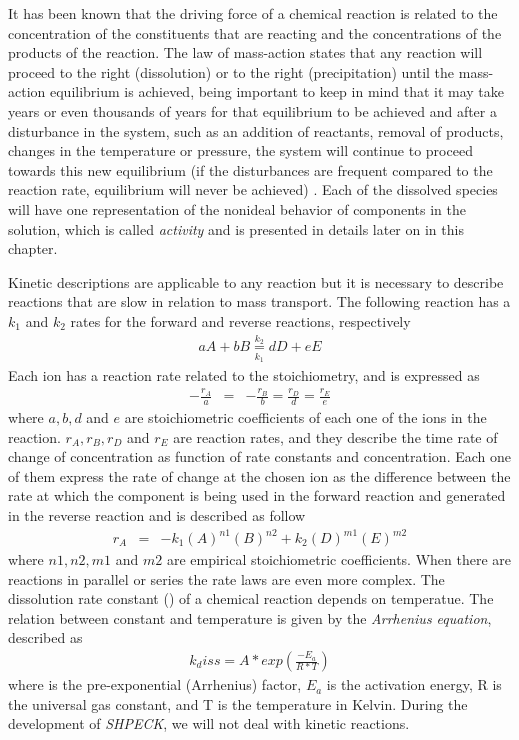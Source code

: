 It has been known that the driving force of a chemical reaction is related to the concentration of the constituents that are reacting and the concentrations of the products of the reaction. The law of mass-action states that any reaction will proceed to the right (dissolution) or to the right (precipitation) until the mass-action equilibrium is achieved, being important to keep in mind that it may take years or even thousands of years for that equilibrium to be achieved and after a disturbance in the system, such as an addition of reactants, removal of products, changes in the temperature or pressure, the system will continue to proceed towards this new equilibrium (if the disturbances are frequent compared to the reaction rate, equilibrium will never be achieved) \cite{Freeze:79}. Each of the dissolved species will have one representation of the nonideal behavior of components in the solution, which is called \emph{activity} and is presented in details later on in this chapter.

Kinetic descriptions are applicable to any reaction but it is necessary to describe  reactions that are slow in relation to mass transport.  The following reaction has a $k_1$ and $k_2$ rates for the forward and reverse reactions, respectively 
\begin{eqnarray}
aA + bB \underset{k_1}{\overset{k_2}{=}} dD + eE 
\end{eqnarray}
Each ion has a reaction rate related to the stoichiometry, and is expressed as
\begin{eqnarray}
-\frac{r_A}{a} &=& -\frac{r_B}{b} = \frac{r_D}{d} = \frac{r_E}{e}
\end{eqnarray}
where $a, b, d$ and $e$ are stoichiometric coefficients of each one of the ions in the reaction. $r_A, r_B, r_D$ and $r_E$ are reaction rates, and they describe the time rate of change of concentration as function of rate constants and concentration. Each one of them express the rate of change at the chosen ion as the difference between the rate at which the component is being used in the forward reaction and generated in the reverse reaction and is described as follow
\begin{eqnarray}
r_A &=& - k_1 (A)^{n1}(B)^{n2} + k_2 (D)^{m1}(E)^{m2}
\end{eqnarray}
where $n1, n2, m1$ and $m2$ are empirical stoichiometric coefficients. When there are reactions in parallel or series the rate laws are even more complex.
The dissolution rate constant () of a chemical reaction depends on temperatue. The relation between constant and temperature is given by the \emph{Arrhenius equation}, described as
\begin{eqnarray}
k_diss = A * exp(\frac{-E_a}{R*T})
\end{eqnarray}
where  is the pre-exponential (Arrhenius) factor, $E_a$ is the activation energy, R is the universal gas constant, and T is the temperature in Kelvin.
During the development of \emph{SHPECK}, we will not deal with kinetic reactions.

